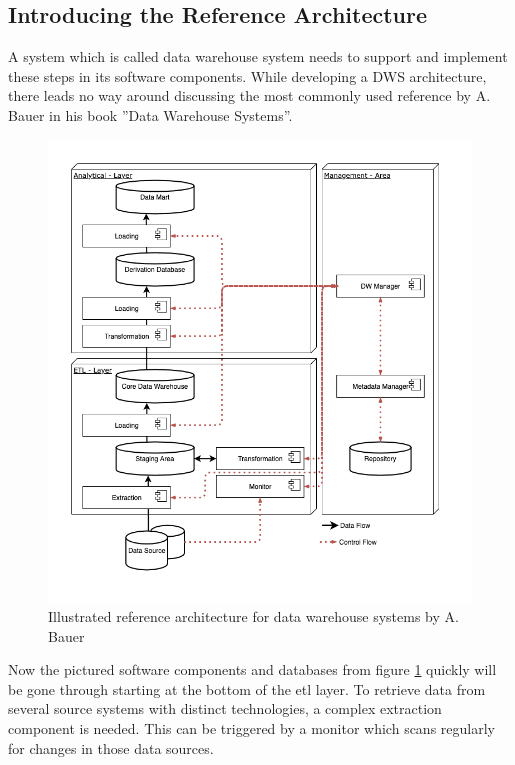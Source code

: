 \subsection{Introducing the Reference Architecture}
A system which is called data warehouse system needs to support and implement these steps in its software components. While developing a DWS architecture, there leads no way around discussing the most commonly used reference by A. Bauer in his book ''Data Warehouse Systems''. \cite{dwsRefArchitecture}\newline
\\
\begin{figure}[!htb]
    \centering
    \includegraphics[scale=0.53]{pictures/InmonHubSpoke.png}
    \caption{Illustrated reference architecture for data warehouse systems by A. Bauer \cite[p.~42]{dwsRefArchitecture}}
    \label{fig:referenceArchitecture}
\end{figure}Now the pictured software components and databases from figure \ref{fig:referenceArchitecture} quickly will be gone through starting at the bottom of the \acrfull{etl} layer. To retrieve data from several source systems with distinct technologies, a complex extraction component is needed. This can be triggered by a monitor which scans regularly for changes in those data sources.\newline
